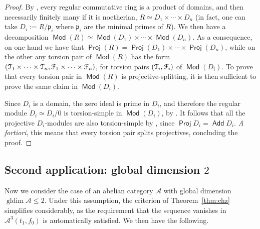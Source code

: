 \documentclass[a4paper,11pt]{amsart}
\theoremstyle{plain}
\theoremstyle{definition}
\newcommand{\Acal}{\mathcal{A}} \newcommand{\Bcal}{\mathcal{B}} \newcommand{\Ccal}{\mathcal{C}}
\DeclareMathOperator{\gldim}{gldim}
\DeclareMathOperator{\Proj}{\mathsf{Proj}}
\DeclareMathOperator{\Add}{\mathsf{Add}}
\DeclareMathOperator{\Mod}{\mathsf{Mod}}
\newcommand{\pf}{\mathfrak{p}}
\begin{document}
\begin{proof}
	By \cite[Cor.~2.2.20]{brun-herz-93}, every regular commutative ring is a
	product of domains, and then necessarily finitely many if it is noetherian,
	$R\simeq D_1\times \cdots \times D_n$ (in fact, one can take $D_i:=R/\pf_i$
	where $\pf_i$ are the minimal primes of $R$).
	We then have a decomposition $\Mod(R)\simeq \Mod(D_1)\times \cdots\times
	\Mod(D_n)$. As a consequence, on one hand we have that $\Proj(R)
	=\Proj(D_1)\times\cdots\times \Proj(D_n)$, while on the other any
	torsion pair of $\Mod(R)$ has the form
	$(\mathcal{T}_1\times\cdots\times\mathcal{T}_n,\mathcal{F}_1\times\cdots\times\mathcal{F}_n)$, for
	torsion pairs $(\mathcal{T}_i,\mathcal{F}_i)$ of $\Mod(D_i)$. To prove that every
	torsion pair in $\Mod(R)$ is projective-splitting, it is then sufficient to
	prove the same claim in $\Mod(D_i)$.

	Since $D_i$ is a domain, the zero ideal is prime in $D_i$, and therefore the regular module $D_i\simeq D_i/0$ is
	torsion-simple in $\Mod(D_i)$, by \cite[Corollary~3.11]{pavo-25a}.
	It follows that all the projective $D_i$-modules are also torsion-simple by
	\cite[Prop.~2.5]{pavo-25a}, since $\Proj D_i=\Add D_i$. \emph{A fortiori},
	this means that every torsion pair splits projectives, concluding the proof.
\end{proof}

\subsection{Second application: global dimension $2$}
\label{subsec:gldim2}

Now we consider the case of an abelian category $\Acal$ with
global dimension $\gldim\Acal\leq 2$. Under this assumption, the criterion of
Theorem~\ref{thm:chz} simplifies considerably, as the requirement that the
sequence vanishes in $\Acal^3(t_1,f_0)$ is automatically satisfied.
We then have the following.
\end{document}
